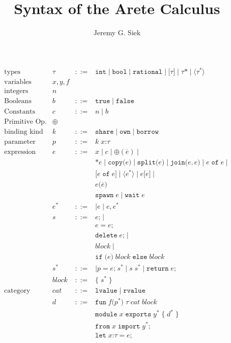 \documentclass{article}
\title{Syntax of the Arete Calculus}
\author{Jeremy G. Siek}
\newcommand{\SC}{\texttt{;}}
\newcommand{\LC}{\texttt{\{}}
\newcommand{\RC}{\texttt{\}}}
\newcommand{\LP}{\texttt{(}}
\newcommand{\RP}{\texttt{)}}
\newcommand{\LS}{\texttt{[}}
\newcommand{\RS}{\texttt{]}}
\newcommand{\EQ}{\mathop{\texttt{=}}}
\newcommand{\OF}{\mathop{\mathtt{of}}}
\begin{document}
\maketitle

\[
\begin{array}{lrcl}
  \text{types}& \tau & ::= & \mathtt{int} \mid \mathtt{bool} \mid
   \mathtt{rational} \mid
   \LS \tau \RS \mid \tau \texttt{*} \mid \langle \tau^{*} \rangle\\
  \text{variables} & x,y,f \\
  \text{integers} & n \\
  \text{Booleans} & b & ::= & \mathtt{true} \mid \mathtt{false}\\
  \text{Constants} & c & ::= & n \mid b \\
  \text{Primitive Op.} & \oplus \\
 \text{binding kind} & k &::= & \mathtt{share} \mid \mathtt{own} \mid
        \mathtt{borrow} \\
 \text{parameter} & p &::= & k \; x \texttt{:} \tau \\
 \text{expression} & e &::= & x \mid c \mid \oplus(\overline{e}) \mid \\
  & & & \texttt{*} e \mid \mathtt{copy}\LP e \RP \mid
        \mathtt{split}\LP e \RP \mid \mathtt{join}\LP e,e \RP \mid
        e \OF e \mid \\
  & & & \LS e \OF e \RS \mid \langle e^{*} \rangle \mid e \LS e \RS \mid \\
  & & & e \LP \overline{e} \RP \\
  & & & \mathtt{spawn}\; e \mid \mathtt{wait}\; e \\
  & e^{*} & ::= & \mid e \mid e \mathop{\texttt{,}} e^{*} \\
  & s &::= & e \SC \mid \\
  & & & e \EQ e\SC\\
  & & & \mathtt{delete}\; e \SC \mid \\
  & & & \mathit{block} \mid \\
  & & & \mathtt{if}\;\LP e \RP\;\mathit{block}\;\mathtt{else}\; \mathit{block}\\
  & s^{*} &::=& \mid p \EQ e\SC \; s^{*} \mid s \; s^{*} \mid \mathtt{return}\; e \SC \\
  & \mathit{block} &::= & \LC\; s^{*} \;\RC \\
  \text{category} & \mathit{cat} & ::= & \mathtt{lvalue} \mid \mathtt{rvalue}\\
  & d & ::= & \mathtt{fun}\; f \LP p^{*} \RP \; \tau \; \mathit{cat} \; \mathit{block}\\
  & & & \mathtt{module} \; x \;\mathtt{exports}\; y^{*} \; \LC\; d^{*} \;\RC\\
  & & & \mathtt{from} \; x \; \mathtt{import}\; y^{*} \SC\\
  & & & \mathtt{let}\; x \texttt{:} \tau \EQ e \SC 
\end{array}
\]
\end{document}
